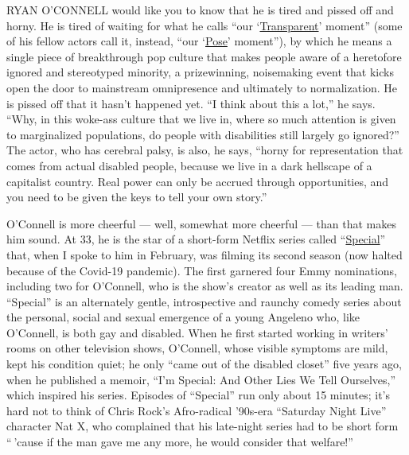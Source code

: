 RYAN O'CONNELL would like you to know that he is tired and pissed off
and horny. He is tired of waiting for what he calls ``our
`\href{https://www.nytimes3xbfgragh.onion/watching/recommendations/watching-tv-transparent}{Transparent}'
moment'' (some of his fellow actors call it, instead, ``our
`\href{https://www.nytimes3xbfgragh.onion/2018/06/01/arts/television/pose-review-fx-ryan-murphy.html}{Pose}'
moment''), by which he means a single piece of breakthrough pop culture
that makes people aware of a heretofore ignored and stereotyped
minority, a prizewinning, noisemaking event that kicks open the door to
mainstream omnipresence and ultimately to normalization. He is pissed
off that it hasn't happened yet. ``I think about this a lot,'' he says.
``Why, in this woke-ass culture that we live in, where so much attention
is given to marginalized populations, do people with disabilities still
largely go ignored?'' The actor, who has cerebral palsy, is also, he
says, ``horny for representation that comes from actual disabled people,
because we live in a dark hellscape of a capitalist country. Real power
can only be accrued through opportunities, and you need to be given the
keys to tell your own story.''

O'Connell is more cheerful --- well, somewhat more cheerful --- than
that makes him sound. At 33, he is the star of a short-form Netflix
series called
``\href{https://www.nytimes3xbfgragh.onion/2019/04/11/arts/television/special-netflix-ryan-oconnell-disabled.html}{Special}''
that, when I spoke to him in February, was filming its second season
(now halted because of the Covid-19 pandemic). The first garnered four
Emmy nominations, including two for O'Connell, who is the show's creator
as well as its leading man. ``Special'' is an alternately gentle,
introspective and raunchy comedy series about the personal, social and
sexual emergence of a young Angeleno who, like O'Connell, is both gay
and disabled. When he first started working in writers' rooms on other
television shows, O'Connell, whose visible symptoms are mild, kept his
condition quiet; he only ``came out of the disabled closet'' five years
ago, when he published a memoir, ``I'm Special: And Other Lies We Tell
Ourselves,'' which inspired his series. Episodes of ``Special'' run only
about 15 minutes; it's hard not to think of Chris Rock's Afro-radical
'90s-era ``Saturday Night Live'' character Nat X, who complained that
his late-night series had to be short form `` 'cause if the man gave me
any more, he would consider that welfare!''

